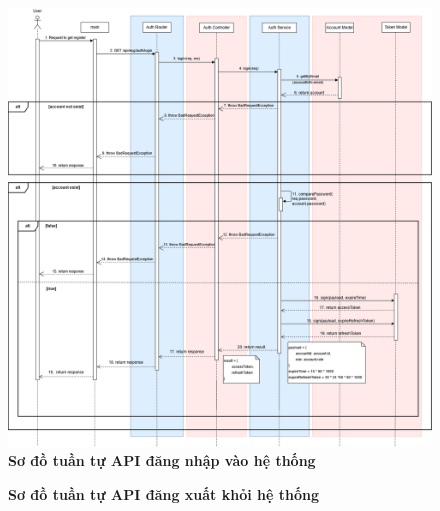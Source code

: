 \begin{figure}[H]
	\centering
	\includegraphics[width=16cm]{Images/api_sequence/authen/authentication-login.drawio.png}
	\caption[Sơ đồ tuần tự API đăng nhập vào hệ thống]{\bfseries \fontsize{12pt}{0pt}\selectfont Sơ đồ tuần tự API đăng nhập vào hệ thống}
	\label{sequence_diagram_login}
\end{figure}

\begin{figure}[H]
	\centering
	\caption[Sơ đồ tuần tự API đăng xuất khỏi hệ thống]{\bfseries \fontsize{12pt}{0pt}\selectfont Sơ đồ tuần tự API đăng xuất khỏi hệ thống}
	\label{sequence_diagram_logout}
\end{figure}

